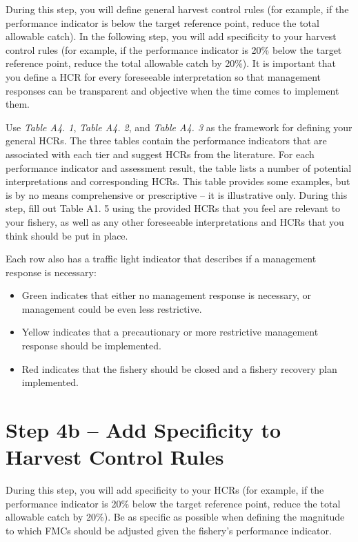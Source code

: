 \documentclass[]{book}
\begin{document}
During this step, you will define general harvest control rules (for
example, if the performance indicator is below the target reference
point, reduce the total allowable catch). In the following step, you
will add specificity to your harvest control rules (for example, if the
performance indicator is 20\% below the target reference point, reduce
the total allowable catch by 20\%). It is important that you define a
HCR for every foreseeable interpretation so that management responses
can be transparent and objective when the time comes to implement them.

Use \emph{Table A4. 1}, \emph{Table A4. 2}, and \emph{Table A4. 3} as
the framework for defining your general HCRs. The three tables contain
the performance indicators that are associated with each tier and
suggest HCRs from the literature. For each performance indicator and
assessment result, the table lists a number of potential interpretations
and corresponding HCRs. This table provides some examples, but is by no
means comprehensive or prescriptive -- it is illustrative only. During
this step, fill out Table A1. 5 using the provided HCRs that you feel
are relevant to your fishery, as well as any other foreseeable
interpretations and HCRs that you think should be put in place.

Each row also has a traffic light indicator that describes if a
management response is necessary:

\begin{itemize}
\item
  Green indicates that either no management response is necessary, or
  management could be even less restrictive.
\item
  Yellow indicates that a precautionary or more restrictive management
  response should be implemented.
\item
  Red indicates that the fishery should be closed and a fishery recovery
  plan implemented.
\end{itemize}

\section{Step 4b -- Add Specificity to Harvest Control
Rules}\label{step-4b-add-specificity-to-harvest-control-rules}

During this step, you will add specificity to your HCRs (for example, if
the performance indicator is 20\% below the target reference point,
reduce the total allowable catch by 20\%). Be as specific as possible
when defining the magnitude to which FMCs should be adjusted given the
fishery's performance indicator.
\end{document}

